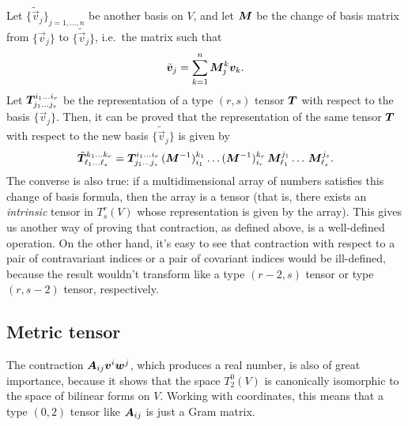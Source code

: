 Let $\{\tilde{\vec{v}}_j\}_{j = 1,\dots,n}$ be another basis on $V$,
and let $\bm{M}$ be the change of basis matrix from $\{\vec{v}_j\}$
to $\{\tilde{\vec{v}}_j\}$, i.e.\ the matrix such that
\[
\tilde{\bm{v}}_j = \sum_{k=1}^n \bm{M}^k_j \bm{v}_k.
\]
Let $\bm{T}^{i_1 \dots i_r}_{j_1 \dots j_s}$ be the representation
of a type $(r,s)$ tensor $\bm{T}$ with respect to the basis $\{\vec{v}_j\}$.
Then, it can be proved that the representation of the same tensor $\bm{T}$
with respect to the new basis $\{\tilde{\vec{v}}_j\}$ is given by
\begin{equation} \label{eq:tensor-change-of-basis}
\tilde{\bm{T}}^{k_1 \dots k_r}_{\ell_1 \dots \ell_s}
= \bm{T}^{i_1 \dots i_r}_{j_1 \dots j_s} \,
(\bm{M}^{-1})_{i_1}^{k_1} \dots (\bm{M}^{-1})_{i_r}^{k_r} \,
\bm{M}^{j_1}_{\ell_1} \dots \, \bm{M}^{j_s}_{\ell_s}.
\end{equation}
The converse is also true: if a multidimensional array of numbers
satisfies this change of basis formula, then the array is a tensor
(that is, there exists an \emph{intrinsic} tensor in $T^r_s(V)$ whose
representation is given by the array). This gives us another way of proving
that contraction, as defined above, is a well-defined operation.
On the other hand, it's easy to see that contraction with respect
to a pair of contravariant indices or a pair of covariant indices would be
ill-defined, because the result wouldn't transform like a type $(r-2,s)$
tensor or type $(r,s-2)$ tensor, respectively.

\subsection*{Metric tensor}

The contraction $\bm{A}_{ij} \bm{v}^i \bm{w}^j$, which produces
a real number, is also of great importance, because it shows
that the space $T^0_2(V)$ is canonically isomorphic to
the space of bilinear forms on $V$. Working with coordinates, this means
that a type $(0,2)$ tensor like $\bm{A}_{ij}$ is just a Gram matrix.

